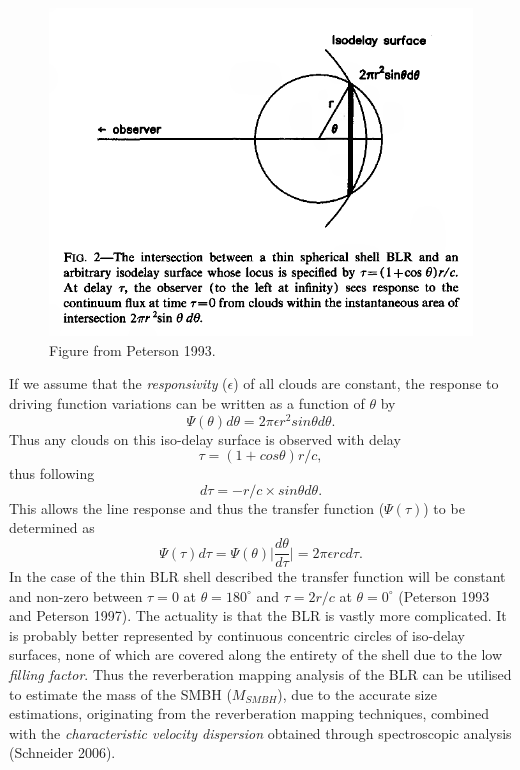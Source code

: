 \documentclass[a4paper, 12pt, twoside]{article}
\begin{document}
\begin{figure}[t!]
\centering
\includegraphics[width=1.00\linewidth]{Figure/BLR_iso_delay.png}
\caption{Figure from Peterson 1993.}
\label{fig:BLR_iso_delay}
\end{figure}
If we assume that the \emph{responsivity} ($\epsilon$) of all clouds are constant, the response to driving function variations can be written as a function of $\theta$ by 
\begin{equation}
\Psi(\theta)d\theta = 2\pi\epsilon r^{2}sin\theta d\theta.
\label{eq:theta_response_function}
\end{equation}
Thus any clouds on this iso-delay surface is observed with delay
\begin{equation}
\tau = (1 + cos\theta)r/c,
\label{eq:cloud_delay}
\end{equation}
thus following
\begin{equation}
d\tau = -r/c\times sin\theta d\theta.
\label{eq:d_tau}
\end{equation}
This allows the line response and thus the transfer function ($\Psi(\tau)$) to be determined as
\begin{equation}
\Psi(\tau)d\tau = \Psi(\theta)\bigg|\frac{d\theta}{d\tau}\bigg| = 2\pi\epsilon rcd\tau.
\label{eq:d_tau}
\end{equation}
In the case of the thin BLR shell described the transfer function will be constant and non-zero between $\tau = 0$ at $\theta = 180^{\circ}$ and $\tau=2r/c$ at $\theta = 0^{\circ}$ (Peterson 1993 and Peterson 1997). The actuality is that the BLR is vastly more complicated. It is probably better represented by continuous concentric circles of iso-delay surfaces, none of which are covered along the entirety of the shell due to the low \emph{filling factor}. Thus the reverberation mapping analysis of the BLR can be utilised to estimate the mass of the SMBH ($M_{SMBH}$), due to the accurate size estimations, originating from the reverberation mapping techniques, combined with the \emph{characteristic velocity dispersion} obtained through spectroscopic analysis (Schneider 2006).  \\
\end{document}
